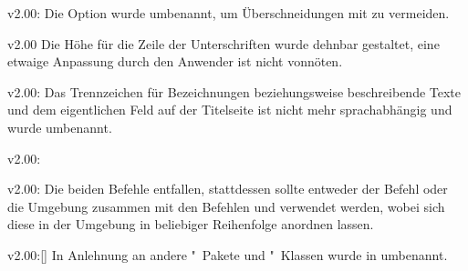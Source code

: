 \begin{Obsolete}{v2.00:}{}
\printobsoletelist%
%
Die Option wurde umbenannt, um Überschneidungen mit  zu 
vermeiden.
\end{Obsolete}

\begin{Obsolete}{v2.00}{}
\printobsoletelist%
%
Die Höhe für die Zeile der Unterschriften wurde dehnbar gestaltet, eine etwaige 
Anpassung durch den Anwender ist nicht vonnöten.
\end{Obsolete}

\begin{Obsolete}{v2.00:}{}%
\printobsoletelist%
%
Das Trennzeichen für Bezeichnungen beziehungsweise beschreibende Texte und dem 
eigentlichen Feld auf der Titelseite ist nicht mehr sprachabhängig und wurde 
umbenannt.
\end{Obsolete}

\begin{Obsolete}{v2.00:}{}
\begin{Obsolete}{v2.00:}{}
\printobsoletelist%
%
Die beiden Befehle entfallen, stattdessen sollte entweder der Befehl 
 oder die Umgebung  zusammen mit 
den Befehlen  und  verwendet werden, 
wobei sich diese in der Umgebung in beliebiger Reihenfolge anordnen lassen.
\end{Obsolete}
\end{Obsolete}

\begin{Obsolete}{v2.00:}{[]}
\printobsoletelist%
%
In Anlehnung an andere "~Pakete und "~Klassen wurde 
 in  umbenannt.
\end{Obsolete}

